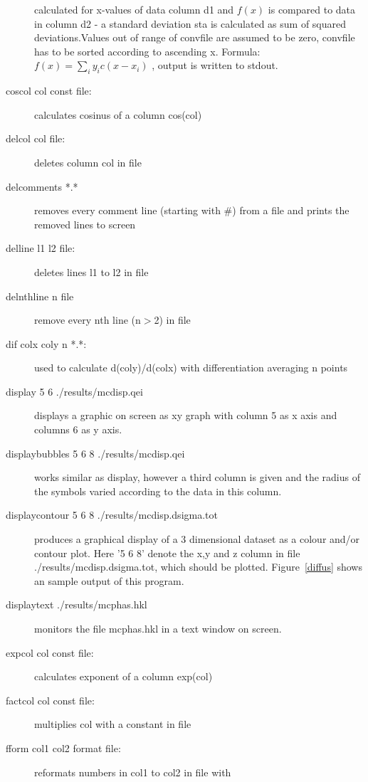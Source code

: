 \begin{description}
		     calculated for x-values of data column d1 and $f(x)$ is compared to
		     data in column d2 - a standard deviation sta is calculated as
		     sum of squared deviations.Values out of range of convfile are assumed to be zero,
			convfile has to be sorted according to ascending x.
			Formula: $f(x)=\sum_i y_i c(x-x_i)$ , 
		       output is written to stdout. 
\item [\prg coscol\index{coscol} col const file:] calculates cosinus of a column cos(col) 
\item [\prg delcol\index{delcol} col file:] deletes column col in file
\item [\prg delcomments *.*] removes every comment line (starting with \#) from a file and %
prints the removed lines to screen
\item [\prg delline\index{delline} l1 l2 file:] deletes lines l1 to l2  in file
\item [\prg delnthline n file]  remove every nth line (n$>$2) in file
\item [\prg dif\index{dif} colx coly n *.*:] used to calculate d(coly)/d(colx) with %
differentiation averaging n points
\item [\prg display\index{display} 5 6  ./results/mcdisp.qei] displays a graphic on screen as xy %
graph
with column 5 as x axis and columns 6 as y axis.
\item [\prg displaybubbles\index{displaybubbles}  5 6 8 ./results/mcdisp.qei] works similar as %
display, however
a third column is given and the radius of the symbols varied according to the data in 
this column.
\item [\prg displaycontour\index{displaycontour} 5 6 8 ./results/mcdisp.dsigma.tot] produces a %
graphical
display of a 3 dimensional dataset as a colour and/or contour plot. Here '5 6 8' 
denote the x,y and z column in file {\prg ./results/mcdisp.dsigma.tot}, which should
be plotted. Figure~\ref{diffus} shows an sample output of this program.
\item [\prg displaytext\index{displaytext} ./results/mcphas.hkl] monitors the file mcphas.hkl in %
a text window
on screen.
\item [\prg expcol\index{expcol} col const file:] calculates exponent of a column exp(col) 
\item [\prg factcol\index{factcol} col const file:] multiplies col with a constant in file
\item [\prg fform\index{fform} col1 col2 format file:] reformats numbers in col1 to col2 in file %
with

\end{description}
